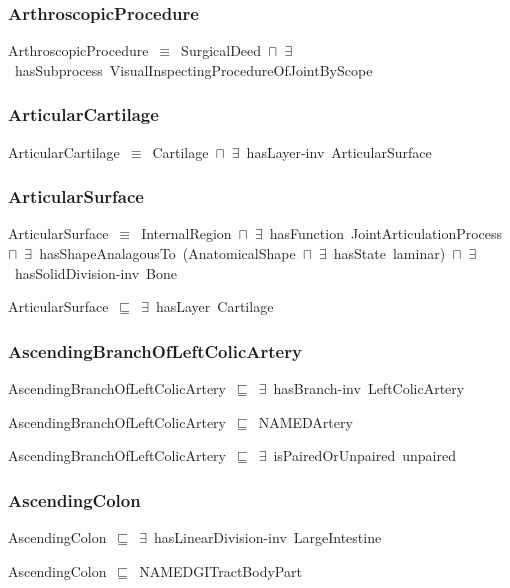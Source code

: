 \documentclass{article}
\begin{document}
\subsubsection*{ArthroscopicProcedure}

ArthroscopicProcedure~\ensuremath{\equiv}~SurgicalDeed~\ensuremath{\sqcap}~\ensuremath{\exists}~hasSubprocess~VisualInspectingProcedureOfJointByScope

\subsubsection*{ArticularCartilage}

ArticularCartilage~\ensuremath{\equiv}~Cartilage~\ensuremath{\sqcap}~\ensuremath{\exists}~hasLayer-inv~ArticularSurface

\subsubsection*{ArticularSurface}

ArticularSurface~\ensuremath{\equiv}~InternalRegion~\ensuremath{\sqcap}~\ensuremath{\exists}~hasFunction~JointArticulationProcess~\ensuremath{\sqcap}~\ensuremath{\exists}~hasShapeAnalagousTo~(AnatomicalShape~\ensuremath{\sqcap}~\ensuremath{\exists}~hasState~laminar)~\ensuremath{\sqcap}~\ensuremath{\exists}~hasSolidDivision-inv~Bone

ArticularSurface~\ensuremath{\sqsubseteq}~\ensuremath{\exists}~hasLayer~Cartilage~

\subsubsection*{AscendingBranchOfLeftColicArtery}

AscendingBranchOfLeftColicArtery~\ensuremath{\sqsubseteq}~\ensuremath{\exists}~hasBranch-inv~LeftColicArtery~

AscendingBranchOfLeftColicArtery~\ensuremath{\sqsubseteq}~NAMEDArtery~

AscendingBranchOfLeftColicArtery~\ensuremath{\sqsubseteq}~\ensuremath{\exists}~isPairedOrUnpaired~unpaired~

\subsubsection*{AscendingColon}

AscendingColon~\ensuremath{\sqsubseteq}~\ensuremath{\exists}~hasLinearDivision-inv~LargeIntestine~

AscendingColon~\ensuremath{\sqsubseteq}~NAMEDGITractBodyPart~
\end{document}
